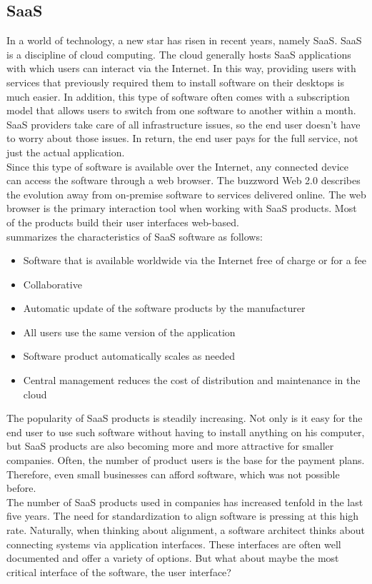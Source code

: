 \subsection{\acl{SaaS}}

In a world of technology, a new star has risen in recent years, namely \acl{SaaS}. \acl{SaaS} is a discipline of cloud computing. The cloud generally hosts \ac{SaaS} applications with which users can interact via the Internet. In this way, providing users with services that previously required them to install software on their desktops is much easier. In addition, this type of software often comes with a subscription model that allows users to switch from one software to another within a month. \\
\ac{SaaS} providers take care of all infrastructure issues, so the end user doesn’t have to worry about those issues. In return, the end user pays for the full service, not just the actual application. \\
Since this type of software is available over the Internet, any connected device can access the software through a web browser. The buzzword Web 2.0 describes the evolution away from on-premise software to services delivered online. The web browser is the primary interaction tool when working with \ac{SaaS} products. Most of the products build their user interfaces web-based. \cite{hill_guide_2013}\\
\citeauthor{hill_guide_2013} summarizes the characteristics of \ac{SaaS} software as follows:
\begin{itemize}
    \item Software that is available worldwide via the Internet free of charge or for a fee
    \item Collaborative
    \item Automatic update of the software products by the manufacturer
    \item All users use the same version of the application
    \item Software product automatically scales as needed
    \item Central management reduces the cost of distribution and maintenance in the 
    cloud
\end{itemize}
The popularity of \ac{SaaS} products is steadily increasing. Not only is it easy for the end user to use such software without having to install anything on his computer, but \ac{SaaS} products are also becoming more and more attractive for smaller companies. Often, the number of product users is the base for the payment plans. Therefore, even small businesses can afford software, which was not possible before. \cite{sury_software-as--service-modell_2020}\\
The number of \ac{SaaS} products used in companies has increased tenfold in the last five years. \cite{stastista_saas_2021} The need for standardization to align software is pressing at this high rate. Naturally, when thinking about alignment, a software architect thinks about connecting systems via application interfaces. These interfaces are often well documented and offer a variety of options. But what about maybe the most critical interface of the software, the user interface?